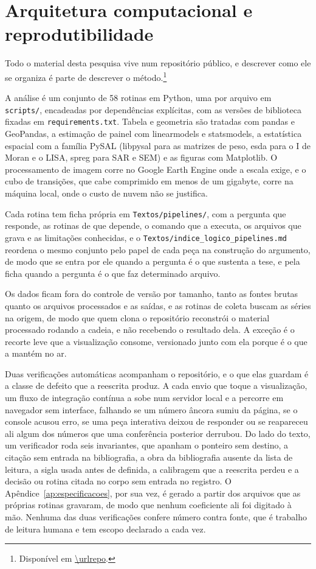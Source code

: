 \section{Arquitetura computacional e reprodutibilidade}
\label{sec:met-repro}

Todo o material desta pesquisa vive num repositório público, e descrever como
ele se organiza é parte de descrever o método.\footnote{Disponível em
\url{\urlrepo}.}

A análise é um conjunto de 58 rotinas em Python, uma por arquivo em
\texttt{scripts/}, encadeadas por dependências explícitas, com as versões de
biblioteca fixadas em \texttt{requirements.txt}. Tabela e geometria são
tratadas com pandas e GeoPandas, a estimação de painel com linearmodels e
statsmodels, a estatística espacial com a família PySAL (libpysal para as
matrizes de peso, esda para o I de Moran e o LISA, spreg para SAR e SEM) e as
figuras com Matplotlib. O processamento de imagem corre no Google Earth Engine
onde a escala exige, e o cubo de transições, que cabe comprimido em menos de um
gigabyte, corre na máquina local, onde o custo de nuvem não se justifica.

Cada rotina tem ficha própria em \texttt{Textos/pipelines/}, com a pergunta que
responde, as rotinas de que depende, o comando que a executa, os arquivos que
grava e as limitações conhecidas, e o
\texttt{Textos/indice\_logico\_pipelines.md} reordena o mesmo conjunto pelo
papel de cada peça na construção do argumento, de modo que se entra por ele
quando a pergunta é o que sustenta a tese, e pela ficha quando a pergunta é o
que faz determinado arquivo.

Os dados ficam fora do controle de versão por tamanho, tanto as fontes brutas
quanto os arquivos processados e as saídas, e as rotinas de coleta buscam as
séries na origem, de modo que quem clona o repositório reconstrói o material
processado rodando a cadeia, e não recebendo o resultado dela. A exceção é o
recorte leve que a visualização consome, versionado junto com ela porque é o
que a mantém no ar.

Duas verificações automáticas acompanham o repositório, e o que elas guardam é
a classe de defeito que a reescrita produz. A cada envio que toque a
visualização, um fluxo de integração contínua a sobe num servidor local e a
percorre em navegador sem interface, falhando se um número âncora sumiu da
página, se o console acusou erro, se uma peça interativa deixou de responder ou
se reapareceu ali algum dos números que uma conferência posterior derrubou. Do
lado do texto, um verificador roda seis invariantes, que apanham o ponteiro sem
destino, a citação sem entrada na bibliografia, a obra da bibliografia ausente
da lista de leitura, a sigla usada antes de definida, a calibragem que a
reescrita perdeu e a decisão ou rotina citada no corpo sem entrada no registro.
O Apêndice~\ref{ap:especificacoes}, por sua vez, é gerado a partir dos arquivos
que as próprias rotinas gravaram, de modo que nenhum coeficiente ali foi
digitado à mão. Nenhuma das duas verificações confere número contra fonte, que
é trabalho de leitura humana e tem escopo declarado a cada vez.

